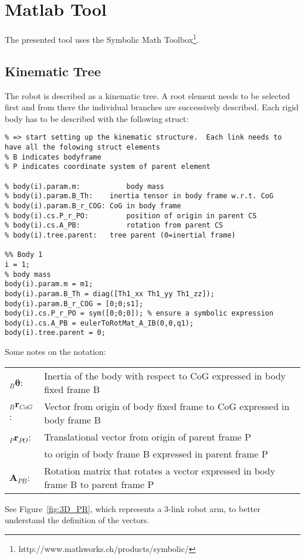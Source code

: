 \chapter{Matlab Tool}

The presented tool uses the Symbolic Math Toolbox\footnote{http://www.mathworks.ch/products/symbolic/}. 

\section{Kinematic Tree}\label{sec:kintree}
The robot is described as a kinematic tree.  
A root element needs to be selected first and from there the individual branches are successively described.
Each rigid body has to be described with the following struct:


\begin{lstlisting}
% => start setting up the kinematic structure.  Each link needs to have all the folowing struct elements 
% B indicates bodyframe
% P indicates coordinate system of parent element

% body(i).param.m: 			 body mass
% body(i).param.B_Th: 	 inertia tensor in body frame w.r.t. CoG
% body(i).param.B_r_COG: CoG in body frame
% body(i).cs.P_r_PO:		 position of origin in parent CS
% body(i).cs.A_PB:  		 rotation from parent CS
% body(i).tree.parent:   tree parent (0=inertial frame)

%% Body 1
i = 1;
% body mass
body(i).param.m = m1;   
body(i).param.B_Th = diag([Th1_xx Th1_yy Th1_zz]); 
body(i).param.B_r_COG = [0;0;s1];
body(i).cs.P_r_PO = sym([0;0;0]); % ensure a symbolic expression
body(i).cs.A_PB = eulerToRotMat_A_IB(0,0,q1);
body(i).tree.parent = 0;
\end{lstlisting}
Some notes on the notation:\\
\begin{tabular}{ll}
$_B\boldsymbol{\theta}$: & Inertia of the body with respect to CoG expressed in body fixed frame B\\
$_B\mathbf{r}_{CoG}$: & Vector from origin of body fixed frame to CoG expressed in body frame B\\
$_P\mathbf{r}_{PO}$: & Translational vector from origin of parent frame P \\ & to origin of body frame B expressed in parent frame P \\
$\mathbf{A}_{PB}$: & Rotation matrix that rotates a vector expressed in body frame B to parent frame P
\end{tabular}
See Figure~\ref{fig:3D_PR}, which represents a 3-link robot arm, to better understand the definition of the vectors.
\clearpage
